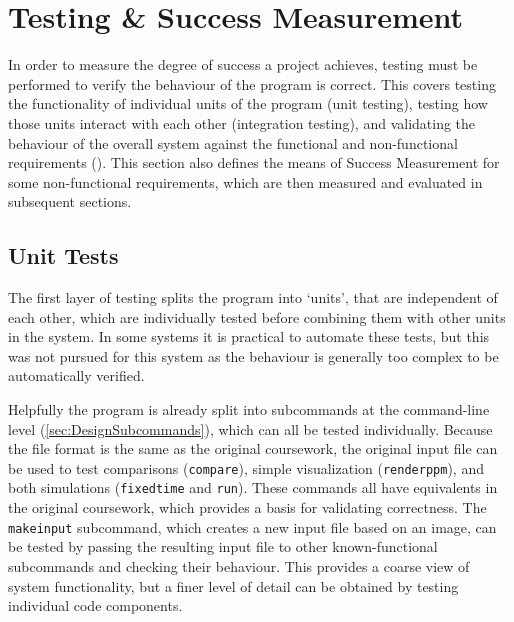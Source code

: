 \chapter{Testing \& Success Measurement}
In order to measure the degree of success a project achieves, testing must be performed to verify the behaviour of the program is correct.
This covers testing the functionality of individual units of the program (unit testing), testing how those units interact with each other (integration testing), and validating the behaviour of the overall system against the functional and non-functional requirements ().
This section also defines the means of Success Measurement for some non-functional requirements, which are then measured and evaluated in subsequent sections.%

\section{Unit Tests}
The first layer of testing splits the program into `units', that are independent of each other, which are individually tested before combining them with other units in the system.
In some systems it is practical to automate these tests, but this was not pursued for this system as the behaviour is generally too complex to be automatically verified.

Helpfully the program is already split into subcommands at the command-line level (\cref{sec:DesignSubcommands}), which can all be tested individually.
Because the file format is the same as the original coursework, the original input file can be used to test comparisons (\texttt{compare}), simple visualization (\texttt{renderppm}), and both simulations (\texttt{fixedtime} and \texttt{run}).
These commands all have equivalents in the original coursework, which provides a basis for validating correctness.
The \texttt{makeinput} subcommand, which creates a new input file based on an image, can be tested by passing the resulting input file to other known-functional subcommands and checking their behaviour.
This provides a coarse view of system functionality, but a finer level of detail can be obtained by testing individual code components.

